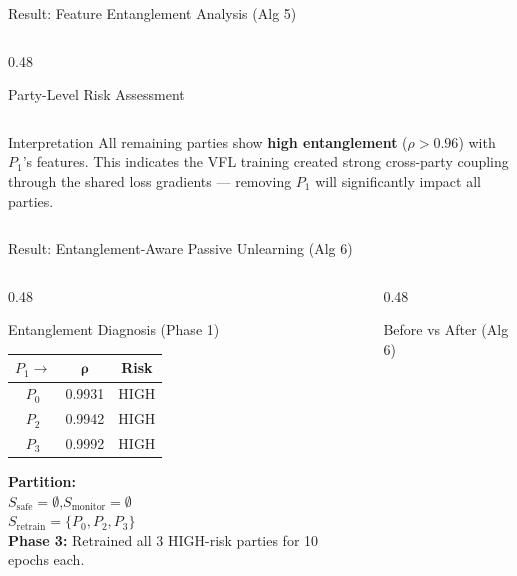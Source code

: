 \documentclass[aspectratio=169, 11pt]{beamer}
\begin{document}
\begin{frame}{Result: Feature Entanglement Analysis (Alg 5)}
\begin{columns}[T]
\begin{column}{0.48\textwidth}
\begin{block}{Party-Level Risk Assessment}
\begin{tabular}{>{\bfseries\footnotesize}c >{\footnotesize}c >{\footnotesize}c}
          \bottomrule
        \end{tabular}
      \end{block}
      \vspace{0.3cm}
      \begin{alertblock}{Interpretation}
        \footnotesize
        All remaining parties show \textbf{high entanglement} ($\rho > 0.96$) with $P_1$'s features. This indicates the VFL training created strong cross-party coupling through the shared loss gradients --- removing $P_1$ will significantly impact all parties.
      \end{alertblock}
    \end{column}
  \end{columns}
\end{frame}

\begin{frame}{Result: Entanglement-Aware Passive Unlearning (Alg 6)}
  \begin{columns}[T]
    \begin{column}{0.48\textwidth}
      \begin{block}{Entanglement Diagnosis (Phase 1)}
        \centering
        \renewcommand{\arraystretch}{1.3}
        \begin{tabular}{>{\footnotesize}c >{\footnotesize}c >{\footnotesize}c}
          \toprule
          \textbf{$P_1 \to$} & $\boldsymbol{\rho}$ & \textbf{Risk} \\
          \midrule
          $P_0$ & 0.9931 & \textcolor{accentred}{HIGH} \\
          $P_2$ & 0.9942 & \textcolor{accentred}{HIGH} \\
          $P_3$ & 0.9992 & \textcolor{accentred}{HIGH} \\
          \bottomrule
        \end{tabular}
      \end{block}
      \vspace{0.2cm}
      \footnotesize
      \textbf{Partition:}\\
      $S_{\text{safe}} = \emptyset$,\quad $S_{\text{monitor}} = \emptyset$\\
      $S_{\text{retrain}} = \{P_0, P_2, P_3\}$\\[0.2cm]
      \textbf{Phase 3:} Retrained all 3 HIGH-risk parties for 10 epochs each.
    \end{column}
    \begin{column}{0.48\textwidth}
      \begin{block}{Before vs After (Alg 6)}

\end{block}
\end{column}
\end{columns}
\end{frame}
\end{document}
